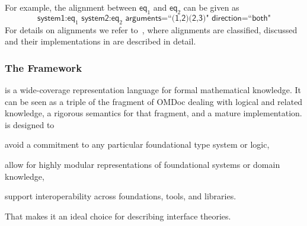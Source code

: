 For example, the alignment between $\textsf{eq}_1$ and $\textsf{eq}_2$ can be given as
	\[\textsf{system1:eq}_1\textsf{ system2:eq}_2\textsf{ arguments=``(1,2)(2,3)" direction=``both"}\]
For details on alignments we refer to~\cite{MueGauKal:cacfms17}, where alignments are classified, discussed and their implementations in \mmt are described in detail.

\subsubsection{The \mmt Framework}

\mmt \cite{RabKoh:WSMSML13,rabe:howto:14} is a wide-coverage representation language for formal mathematical knowledge.
It can be seen as a triple of the fragment of OMDoc \cite{Kohlhase:OMDoc1.2} dealing with logical and related knowledge, a rigorous semantics for that fragment, and a mature implementation.
\ommt is designed to
\begin{compactitem}
 \item avoid a commitment to any particular foundational type system or logic,
 \item allow for highly modular representations of foundational systems or domain knowledge,
 \item support interoperability across foundations, tools, and libraries.
\end{compactitem}
That makes it an ideal choice for describing interface theories.
